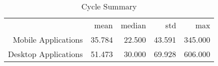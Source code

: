 \begin{table}[ht]
\centering
\caption{Cycle Summary} 
\begin{tabular}{rrrrr}
  & mean & median & std & max \\ 
 Mobile Applications & 35.784 & 22.500 & 43.591 & 345.000 \\ 
   \hline
Desktop Applications & 51.473 & 30.000 & 69.928 & 606.000 \\ 
  \end{tabular}
  \label{tab:sumshortcycles}
\end{table}
